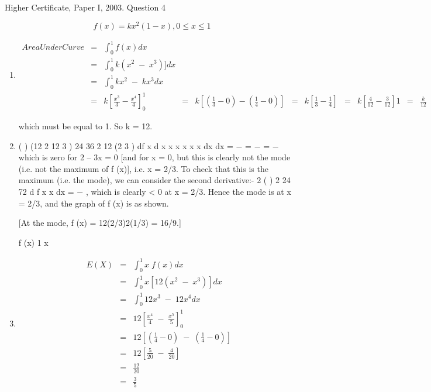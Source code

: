 \documentclass[a4paper,12pt]{article}
\begin{document}
Higher Certificate, Paper I, 2003. Question 4

\[f(x) = kx^2 (1− x) , 0 \leq x \leq 1 \]
\begin{enumerate}
\item 
\begin{eqnarray*}
Area Under Curve &=& \int^{1}_{0} f(x) dx \\
&=& \int^{1}_{0} k(x^2\;-\;x^3)] dx \\
&=& \int^{1}_{0} kx^2\;-\;kx^3 dx \\
&=& k \left[ \frac{x^3}{3} - \frac{x^4}{4}\right]^1_0
&=& k \left[ \left( \frac{1}{3}- 0 \right) - \left( \frac{1}{4}- 0 \right)  \right]
&=& k \left[  \frac{1}{3} - \frac{1}{4} \right]
&=& k \left[  \frac{4}{12} - \frac{3}{12} \right]
1 &=&  \frac{k}{12} 
\end{eqnarray*}

which must be equal to 1. So k = 12.
\item  ( ) (12 2 12 3 ) 24 36 2 12 (2 3 )
df x d x x x x x x
dx dx
= − = − = −
which is zero for 2 – 3x = 0 [and for x = 0, but this is clearly not the mode (i.e.
                                                                               not the maximum of f (x)], i.e. x = 2/3. To check that this is the maximum (i.e.
                                                                                                                                                           the mode), we can consider the second derivative:-
  2 ( )
2 24 72
d f x
x
dx
= − , which is clearly < 0 at x = 2/3.
Hence the mode is at x = 2/3, and the graph of f (x) is as shown. 


[At the mode, f (x) = 12(2/3)2(1/3) = 16/9.]

f (x)
1 x

\item  
\begin{eqnarray*}
E(X) &=& \int^{1}_{0} x \;f(x) dx \\
&=& \int^{1}_{0} x[12(x^2\;-\;x^3)] dx \\
&=& \int^{1}_{0} 12x^3\;-\;12x^4 dx \\
&=& 12 \left[ \frac{x^4}{4} \;-\; \frac{x^5}{5}\right]^1_0\\
&=& 12 \left[ \left( \frac{1}{4}- 0 \right) \;-\; \left( \frac{1}{4}- 0 \right)  \right]\\
&=& 12 \left[  \frac{5}{20} \;-\; \frac{4}{20} \right]\\
&=&  \frac{12}{20} \\
&=&  \frac{3}{5}\\
\end{eqnarray*}



\end{enumerate}
\end{document}
